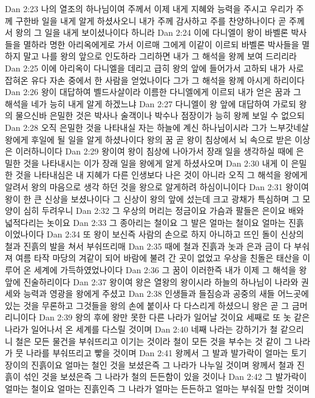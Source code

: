 Dan 2:23  나의 열조의 하나님이여 주께서 이제 내게 지혜와 능력을 주시고 우리가 주께 구한바 일을 내게 알게 하셨사오니 내가 주께 감사하고 주를 찬양하나이다 곧 주께서 왕의 그 일을 내게 보이셨나이다 하니라
Dan 2:24  이에 다니엘이 왕이 바벨론 박사들을 멸하라 명한 아리옥에게로 가서 이르매 그에게 이같이 이르되 바벨론 박사들을 멸하지 말고 나를 왕의 앞으로 인도하라 그리하면 내가 그 해석을 왕께 보여 드리리라
Dan 2:25  이에 아리옥이 다니엘을 데리고 급히 왕의 앞에 들어가서 고하되 내가 사로잡혀온 유다 자손 중에서 한 사람을 얻었나이다 그가 그 해석을 왕께 아시게 하리이다
Dan 2:26  왕이 대답하여 벨드사살이라 이름한 다니엘에게 이르되 내가 얻은 꿈과 그 해석을 네가 능히 내게 알게 하겠느냐
Dan 2:27  다니엘이 왕 앞에 대답하여 가로되 왕의 물으신바 은밀한 것은 박사나 술객이나 박수나 점장이가 능히 왕께 보일 수 없으되
Dan 2:28  오직 은밀한 것을 나타내실 자는 하늘에 계신 하나님이시라 그가 느부갓네살왕에게 후일에 될 일을 알게 하셨나이다 왕의 꿈 곧 왕이 침상에서 뇌 속으로 받은 이상은 이러하니이다
Dan 2:29  왕이여 왕이 침상에 나아가서 장래 일을 생각하실 때에 은밀한 것을 나타내시는 이가 장래 일을 왕에게 알게 하셨사오며
Dan 2:30  내게 이 은밀한 것을 나타내심은 내 지혜가 다른 인생보다 나은 것이 아니라 오직 그 해석을 왕에게 알려서 왕의 마음으로 생각 하던 것을 왕으로 알게하려 하심이니이다
Dan 2:31  왕이여 왕이 한 큰 신상을 보셨나이다 그 신상이 왕의 앞에 섰는데 크고 광채가 특심하며 그 모양이 심히 두려우니
Dan 2:32  그 우상의 머리는 정금이요 가슴과 팔들은 은이요 배와 넓적다리는 놋이요
Dan 2:33  그 종아리는 철이요 그 발은 얼마는 철이요 얼마는 진흙이었나이다
Dan 2:34  또 왕이 보신즉 사람의 손으로 하지 아니하고 뜨인 돌이 신상의 철과 진흙의 발을 쳐서 부숴뜨리매
Dan 2:35  때에 철과 진흙과 놋과 은과 금이 다 부숴져 여름 타작 마당의 겨같이 되어 바람에 불려 간 곳이 없었고 우상을 친돌은 태산을 이루어 온 세계에 가득하였었나이다
Dan 2:36  그 꿈이 이러한즉 내가 이제 그 해석을 왕 앞에 진술하리이다
Dan 2:37  왕이여 왕은 열왕의 왕이시라 하늘의 하나님이 나라와 권세와 능력과 영광을 왕에게 주셨고
Dan 2:38  인생들과 들짐승과 공중의 새들 어느곳에 있는 것을 무론하고 그것들을 왕의 손에 붙이사 다 다스리게 하셨으니 왕은 곧 그 금머리니이다
Dan 2:39  왕의 후에 왕만 못한 다른 나라가 일어날 것이요 세째로 또 놋 같은 나라가 일어나서 온 세계를 다스릴 것이며
Dan 2:40  네째 나라는 강하기가 철 같으리니 철은 모든 물건을 부숴뜨리고 이기는 것이라 철이 모든 것을 부수는 것 같이 그 나라가 뭇 나라를 부숴뜨리고 빻을 것이며
Dan 2:41  왕께서 그 발과 발가락이 얼마는 토기장이의 진흙이요 얼마는 철인 것을 보셨은즉 그 나라가 나누일 것이며 왕께서 철과 진흙이 섞인 것을 보셨은즉 그 나라가 철의 든든함이 있을 것이나
Dan 2:42  그 발가락이 얼마는 철이요 얼마는 진흙인즉 그 나라가 얼마는 든든하고 얼마는 부숴질 만할 것이며
